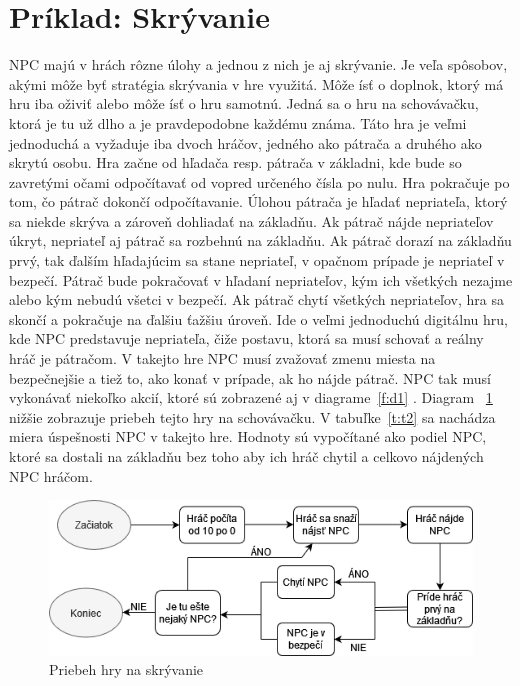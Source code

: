 \documentclass[10pt,twoside,slovak,a4paper]{article}
\begin{document}
\section{Príklad: Skrývanie} 
\quad NPC majú v hrách rôzne úlohy a jednou z nich je aj skrývanie. Je veľa spôsobov, akými môže byť stratégia skrývania v hre využitá. Môže ísť o doplnok, ktorý má hru iba oživiť alebo môže ísť o hru samotnú. Jedná sa o hru na schovávačku, ktorá je tu už dlho a je pravdepodobne každému známa. Táto hra je veľmi jednoduchá a vyžaduje iba dvoch hráčov, jedného ako pátrača a druhého ako skrytú osobu. Hra začne od hľadača resp. pátrača v základni, kde bude so zavretými očami odpočítavať od vopred určeného čísla po nulu. Hra pokračuje po tom, čo pátrač dokončí odpočítavanie. Úlohou pátrača je hľadať nepriateľa, ktorý sa niekde skrýva a zároveň dohliadať na základňu. Ak pátrač nájde nepriateľov úkryt, nepriateľ aj pátrač sa rozbehnú na základňu. Ak pátrač dorazí na základňu prvý, tak ďalším hľadajúcim sa stane nepriateľ, v opačnom prípade je nepriateľ v bezpečí. Pátrač bude pokračovať v hľadaní nepriateľov, kým ich všetkých nezajme alebo kým nebudú všetci v bezpečí. Ak pátrač chytí všetkých nepriateľov, hra sa skončí a pokračuje na ďalšiu ťažšiu úroveň. Ide o veľmi jednoduchú digitálnu hru, kde NPC predstavuje nepriateľa, čiže postavu, ktorá sa musí schovať a reálny hráč je pátračom. V takejto hre NPC musí zvažovať zmenu miesta na bezpečnejšie a tiež to, ako konať v prípade, ak ho nájde pátrač. NPC tak musí vykonávať niekoľko akcií, ktoré sú zobrazené aj v diagrame~\ref{f:d1} . Diagram ~\ref{f:d2} nižšie zobrazuje priebeh tejto hry na schovávačku. V tabuľke~\ref{t:t2} sa nachádza miera úspešnosti NPC v takejto hre. Hodnoty sú vypočítané ako podiel NPC, ktoré sa dostali na základňu bez toho aby ich hráč chytil a celkovo nájdených NPC hráčom.
\begin{figure}[tbh]
\center\includegraphics[scale=0.5]{diagram2.png}
\caption{Priebeh hry na skrývanie}
\label{f:d2}
\end{figure}
\end{document}

